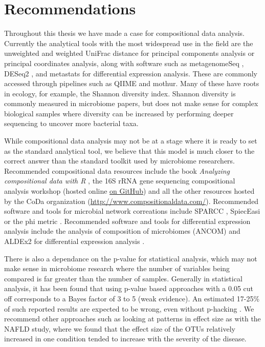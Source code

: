 \section{Recommendations}
Throughout this thesis we have made a case for compositional data analysis. Currently the analytical tools with the most widespread use in the field are the unweighted and weighted UniFrac distance for principal components analysis or principal coordinates analysis, along with software such as metagenomeSeq \cite{paulson2014metagenomeseq}, DESeq2 \cite{love2014moderated}, and metastats \cite{paulson2011metastats} for differential expression analysis. These are commonly accessed through pipelines such as QIIME and mothur. Many of these have roots in ecology, for example, the Shannon diversity index. Shannon diversity is commonly measured in microbiome papers, but does not make sense for complex biological samples where diversity can be increased by performing deeper sequencing to uncover more bacterial taxa.

While compositional data analysis may not be at a stage where it is ready to set as the standard analytical tool, we believe that this model is much closer to the correct answer than the standard toolkit used by microbiome researchers. Recommended compositional data resources include the book \textit{Analyzing compositional data with R} \cite{van2013analyzing}, the 16S rRNA gene sequencing compositional analysis workshop (hosted online \href{https://github.com/ggloor/compositions/blob/master/background_reading/CJM_supplement/workshop.pdf}{on GitHub}) and all the other resources hosted by the CoDa organization (\url{http://www.compositionaldata.com/}). Recommended software and tools for microbial network correations include SPARCC \cite{friedman2012inferring}, SpiecEasi \cite{kurtz2015sparse} or the phi metric \cite{lovell2015proportionality}. Recommended software and tools for differential expression analysis include the analysis of composition of microbiomes (ANCOM) \cite{mandal2015analysis} and ALDEx2 for differential expression analysis \cite{fernandes2014unifying}.

There is also a dependance on the p-value for statistical analysis, which may not make sense in microbiome research where the number of variables being compared is far greater than the number of samples. Generally in statistical analysis, it has been found that using p-value based approaches with a 0.05 cut off corresponds to a Bayes factor of 3 to 5 (weak evidence). An estimated 17-25\% of such reported results are expected to be wrong, even without p-hacking \cite{johnson2013revised}. We recommend other approaches such as looking at patterns in effect size as with the NAFLD study, where we found that the effect size of the OTUs relatively increased in one condition tended to increase with the severity of the disease.

